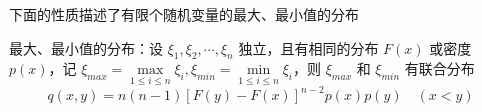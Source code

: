 \documentclass[12pt,a4paper]{amsart}
\begin{document}
下面的性质描述了有限个随机变量的最大、最小值的分布

\begin{proposition}
    最大、最小值的分布：设 $\xi_1, \xi_2, \cdots, \xi_n$ 独立，且有相同的分布 $F(x)$ 或密度 $p(x)$，记 $\xi_{max} = \max\limits_{1\leq i\leq n}\xi_i, \xi_{min} = \min\limits_{1\leq i\leq n}\xi_i$，则 $\xi_{max}$ 和 $\xi_{min}$ 有联合分布
    \begin{equation}
        q(x, y) = n(n-1)[F(y)-F(x)]^{n-2}p(x)p(y) \quad (x < y)
    \end{equation}
\end{proposition}


\appendix



{\footnotesize}
\end{document}
